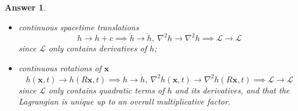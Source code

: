 \documentclass[a4paper]{article}
\newtheorem{ans}{Answer}[section]
\theoremstyle{new}
\begin{document}
\begin{ans}
\begin{enumerate}[label=(\alph*)]
\begin{itemize}
    \item continuous spacetime translations
    $$h\rightarrow h+c\implies\dot{h}\rightarrow\dot{h},~\nabla^2h\rightarrow\nabla^2h\implies\mathcal{L}\rightarrow\mathcal{L}$$
    since $\mathcal{L}$ only contains derivatives of $h$;
    \item continuous rotations of $\mathbf{x}$
    $$h(\mathbf{x},t)\rightarrow h(R\mathbf{x},t)\implies\dot{h}\rightarrow\dot{h},~\nabla^2h(\mathbf{x},t)\rightarrow\nabla^2h(R\mathbf{x},t)\implies\mathcal{L}\rightarrow\mathcal{L}$$
    since $\mathcal{L}$ only contains quadratic terms of $h$ and its derivatives, and that the Lagrangian is unique up to an overall multiplicative factor.
\end{itemize}
\end{enumerate}
\end{ans}
\newpage
\end{document}
